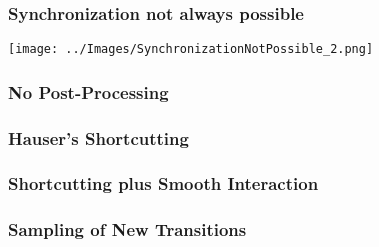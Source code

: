 \documentclass[12pt, %
			  t     %
]{beamer}%
\begin{document}
\begin{frame}
\frametitle{Synchronization not always possible}
\centering
\texttt{[image: ../Images/SynchronizationNotPossible\_2.png]}
\end{frame}



\begin{frame}
\label{Video_Step1}
\frametitle{No Post-Processing}
\centering
{}
\hyperlink{Plot_Step1}{}
\end{frame}

\begin{frame}
\label{Video_Step2}
\frametitle{Hauser's Shortcutting}
\centering
{}
\hyperlink{Plot_Step2}{}
\end{frame}

\begin{frame}
\label{Video_Step3}
\frametitle{Shortcutting plus Smooth Interaction}
\centering
{}
\hyperlink{Plot_Step3}{}
\end{frame}

\begin{frame}
\label{Video_Step4}
\frametitle{Sampling of New Transitions}
\centering
{}
\hyperlink{Plot_Step4}{}
\end{frame}
\end{document}
